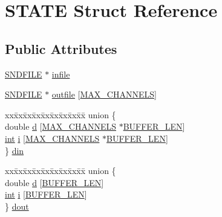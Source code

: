 \hypertarget{struct_s_t_a_t_e}{}\section{S\+T\+A\+TE Struct Reference}
\label{struct_s_t_a_t_e}
\subsection*{Public Attributes}
\begin{DoxyCompactItemize}
\item 
\hyperlink{mac_2config_2i386_2lib-src_2libsndfile_2src_2sndfile_8h_ac14209bc83d532b06a8cdf9ade6d544a}{S\+N\+D\+F\+I\+LE} $\ast$ \hyperlink{struct_s_t_a_t_e_a643e9bb7ddce734acf826199a7d5e3d7}{infile}
\item 
\hyperlink{mac_2config_2i386_2lib-src_2libsndfile_2src_2sndfile_8h_ac14209bc83d532b06a8cdf9ade6d544a}{S\+N\+D\+F\+I\+LE} $\ast$ \hyperlink{struct_s_t_a_t_e_a8161c6dc82d05b454ebaa8715579d880}{outfile} \mbox{[}\hyperlink{patest__multi__sine_8c_ac69ee46f4a51ed14f0d68628c2dec71d}{M\+A\+X\+\_\+\+C\+H\+A\+N\+N\+E\+LS}\mbox{]}
\item 
\begin{tabbing}
xx\=xx\=xx\=xx\=xx\=xx\=xx\=xx\=xx\=\kill
union \{\\
\>double \hyperlink{struct_s_t_a_t_e_ac94f445895e6b5da656238c83324c319}{d} \mbox{[}\hyperlink{patest__multi__sine_8c_ac69ee46f4a51ed14f0d68628c2dec71d}{MAX\_CHANNELS} $\ast$\hyperlink{string__test_8c_a46130dc86f2322714bba26960b64e7bb}{BUFFER\_LEN}\mbox{]}\\
\>\hyperlink{xmltok_8h_a5a0d4a5641ce434f1d23533f2b2e6653}{int} \hyperlink{struct_s_t_a_t_e_ae54a2980cada12bc913f4e7490303a7d}{i} \mbox{[}\hyperlink{patest__multi__sine_8c_ac69ee46f4a51ed14f0d68628c2dec71d}{MAX\_CHANNELS} $\ast$\hyperlink{string__test_8c_a46130dc86f2322714bba26960b64e7bb}{BUFFER\_LEN}\mbox{]}\\
\} \hyperlink{struct_s_t_a_t_e_a8a7a2ae7a005b9fb0f70284042892f8f}{din}\\

\end{tabbing}\item 
\begin{tabbing}
xx\=xx\=xx\=xx\=xx\=xx\=xx\=xx\=xx\=\kill
union \{\\
\>double \hyperlink{struct_s_t_a_t_e_ac94f445895e6b5da656238c83324c319}{d} \mbox{[}\hyperlink{string__test_8c_a46130dc86f2322714bba26960b64e7bb}{BUFFER\_LEN}\mbox{]}\\
\>\hyperlink{xmltok_8h_a5a0d4a5641ce434f1d23533f2b2e6653}{int} \hyperlink{struct_s_t_a_t_e_ae54a2980cada12bc913f4e7490303a7d}{i} \mbox{[}\hyperlink{string__test_8c_a46130dc86f2322714bba26960b64e7bb}{BUFFER\_LEN}\mbox{]}\\
\} \hyperlink{struct_s_t_a_t_e_a4679c3589c8635c0f7ed3fad181ed908}{dout}\\


\end{tabbing}
\end{DoxyCompactItemize}
